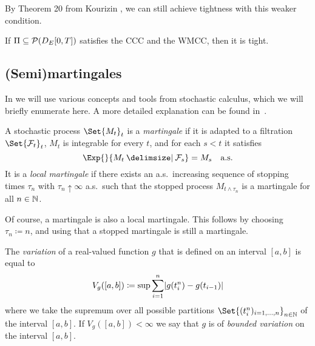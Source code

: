 By Theorem 20 from Kourizin \cite{kouritzinTightnessProbabilityMeasures2015}, we can still achieve tightness with this weaker condition.

\begin{theorem}
  If \( \Pi \subseteq \mathcal{P}(D_{E}[0,T]) \) satisfies the CCC and the WMCC, then it is tight.
\end{theorem}

\subsection{(Semi)martingales}

In  we will use various concepts and tools from stochastic calculus, which we will briefly enumerate here.
A more detailed explanation can be found in~\cite{klebanerIntroductionStochasticCalculus2012}.

\begin{definition}
  A stochastic process \(\Set{M_t}_{t}\) is a \textit{martingale} if it is adapted to a filtration \(\Set{\cF_t}_t\), \( M_t \) is integrable for every \(t\), and for each \( s < t \) it satisfies
  \begin{equation}
    \Exp{}{M_t \given \cF_s} = M_s \quad \text{a.s.}
  \end{equation}
  It is a \textit{local martingale} if there exists an a.s.\ increasing sequence of stopping times \( \tau_n \) with \( \tau_n \uparrow \infty \) a.s.\ such that the stopped process \( M_{t \land \tau_n} \) is a martingale for all \( n \in \mathbb{N} \). %
\end{definition}

Of course, a martingale is also a local martingale.
This follows by choosing \( \tau_n \coloneqq n \), and using that a stopped martingale is still a martingale.

\begin{definition}
  The \textit{variation} of a real-valued function \( g \) that is defined on an interval \( [a,b] \) is equal to
  \begin{equation}
    V_g([a,b]) \coloneqq \sup \sum_{i=1}^n \lvert g(t_i^n) - g(t_{i-1}) \rvert
  \end{equation}
  where we take the supremum over all possible partitions \(\Set{(t_i^n)_{i=1,\dots,n}}_{n\in\bN}\) of the interval \( [a,b] \).
  If \( V_g([a,b]) < \infty \) we say that \( g \) is of \textit{bounded variation} on the interval \( [a,b] \).
\end{definition}

